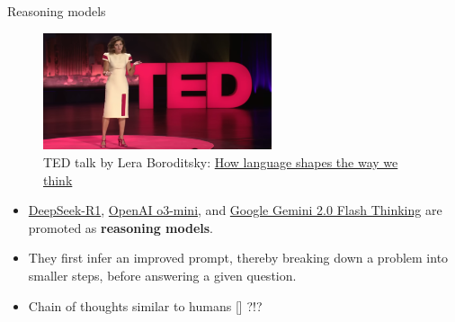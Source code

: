 \documentclass[10pt]{beamer}
\newcommand{\citeme}[1]{{\xspace\color{scAqua} \scriptsize [\cite{#1}]}}
\newcommand{\feature}[1]{{\color{scLime} \textbf{#1}}}
\begin{document}
\begin{frame}{Reasoning models}
	\begin{figure}
		\includegraphics[width=0.6\textwidth]{figures/TEDLeraBoroditsky.png}
		\caption{TED talk by Lera Boroditsky: \href{https://www.youtube.com/watch?v=RKK7wGAYP6k}{How language shapes the way we think}}
	\end{figure}
	\begin{itemize}
		\item \href{https://github.com/deepseek-ai/DeepSeek-R1}{DeepSeek-R1}, \href{https://openai.com/index/openai-o3-mini/}{OpenAI o3-mini}, and \href{https://deepmind.google/technologies/gemini/flash-thinking/}{Google Gemini 2.0 Flash Thinking} are promoted as \feature{reasoning models}.
		\item They first infer an improved prompt, thereby breaking down a problem into smaller steps, before answering a given question.
		\item Chain of thoughts similar to humans \citeme{Boroditsky2018} ?!?
	\end{itemize}
\end{frame}
\end{document}
